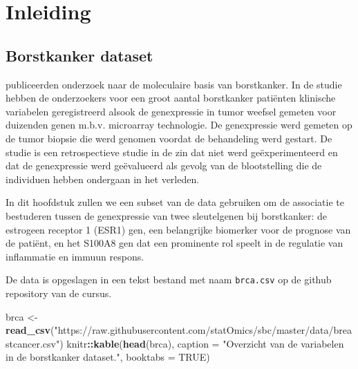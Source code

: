 \documentclass[
  12pt,dutch]{book}
\newenvironment{Shaded}{\begin{snugshade}}{\end{snugshade}}
\newcommand{\AttributeTok}[1]{\textcolor[rgb]{0.13,0.29,0.53}{#1}}
\newcommand{\ConstantTok}[1]{\textcolor[rgb]{0.56,0.35,0.01}{#1}}
\newcommand{\FunctionTok}[1]{\textcolor[rgb]{0.13,0.29,0.53}{\textbf{#1}}}
\newcommand{\NormalTok}[1]{#1}
\newcommand{\OtherTok}[1]{\textcolor[rgb]{0.56,0.35,0.01}{#1}}
\newcommand{\SpecialCharTok}[1]{\textcolor[rgb]{0.81,0.36,0.00}{\textbf{#1}}}
\newcommand{\StringTok}[1]{\textcolor[rgb]{0.31,0.60,0.02}{#1}}
\theoremstyle{definition}
\theoremstyle{definition}
\theoremstyle{definition}
\theoremstyle{definition}
\theoremstyle{remark}
\begin{document}
\section{Inleiding}\label{inleiding-5}

\subsection{Borstkanker dataset}\label{borstkanker-dataset}

\citet{sotiriou2006} publiceerden onderzoek naar de moleculaire basis van borstkanker.
In de studie hebben de onderzoekers voor een groot aantal borstkanker patiënten klinische variabelen geregistreerd alsook de genexpressie in tumor weefsel gemeten voor duizenden genen m.b.v. microarray technologie.
De genexpressie werd gemeten op de tumor biopsie die werd genomen voordat de behandeling werd gestart.
De studie is een retrospectieve studie in de zin dat niet werd geëxperimenteerd en dat de genexpressie werd geëvalueerd als gevolg van de blootstelling die de individuen hebben ondergaan in het verleden.

In dit hoofdstuk zullen we een subset van de data gebruiken om de associatie te bestuderen tussen de genexpressie van twee sleutelgenen bij borstkanker: de estrogeen receptor 1 (ESR1) gen, een belangrijke biomerker voor de prognose van de patiënt, en het S100A8 gen dat een prominente rol speelt in de regulatie van inflammatie en immuun respons.

De data is opgeslagen in een tekst bestand met naam \texttt{brca.csv} op de github repository van de cursus.

\begin{Shaded}
\begin{Highlighting}[]
\NormalTok{brca }\OtherTok{\textless{}{-}} \FunctionTok{read\_csv}\NormalTok{(}\StringTok{"https://raw.githubusercontent.com/statOmics/sbc/master/data/breastcancer.csv"}\NormalTok{)}
\NormalTok{knitr}\SpecialCharTok{::}\FunctionTok{kable}\NormalTok{(}\FunctionTok{head}\NormalTok{(brca), }\AttributeTok{caption =} \StringTok{"Overzicht van de variabelen in de borstkanker dataset."}\NormalTok{,}
    \AttributeTok{booktabs =} \ConstantTok{TRUE}\NormalTok{)}
\end{Highlighting}
\end{Shaded}
\end{document}
